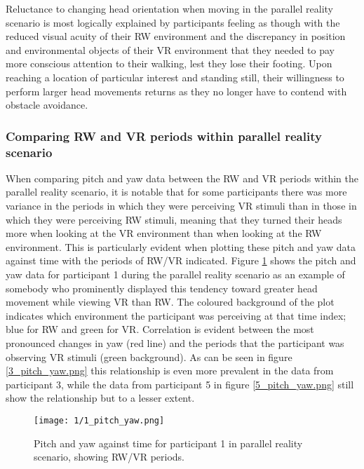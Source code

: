 Reluctance to changing head orientation when moving in the parallel reality scenario is most logically explained by participants feeling as though with the reduced visual acuity of their RW environment and the discrepancy in position and environmental objects of their VR environment that they needed to pay more conscious attention to their walking, lest they lose their footing. Upon reaching a location of particular interest and standing still, their willingness to perform larger head movements returns as they no longer have to contend with obstacle avoidance.

\subsubsection{Comparing RW and VR periods within parallel reality scenario}

When comparing pitch and yaw data between the RW and VR periods within the parallel reality scenario, it is notable that for some participants there was more variance in the periods in which they were perceiving VR stimuli than in those in which they were perceiving RW stimuli, meaning that they turned their heads more when looking at the VR environment than when looking at the RW environment. This is particularly evident when plotting these pitch and yaw data against time with the periods of RW/VR indicated. Figure \ref{1_pitch_yaw.png} shows the pitch and yaw data for participant 1 during the parallel reality scenario as an example of somebody who prominently displayed this tendency toward greater head movement while viewing VR than RW. The coloured background of the plot indicates which environment the participant was perceiving at that time index; blue for RW and green for VR. Correlation is evident between the most pronounced changes in yaw (red line) and the periods that the participant was observing VR stimuli (green background). As can be seen in figure \ref{3_pitch_yaw.png} this relationship is even more prevalent in the data from participant 3, while the data from participant 5 in figure \ref{5_pitch_yaw.png} still show the relationship but to a lesser extent.

\begin{figure}
	\begin{center}
	\texttt{[image: 1/1\_pitch\_yaw.png]}
	\caption{Pitch and yaw against time for participant 1 in parallel reality scenario, showing RW/VR periods.}
	\label{1_pitch_yaw.png}
	\end{center}
\end{figure}

